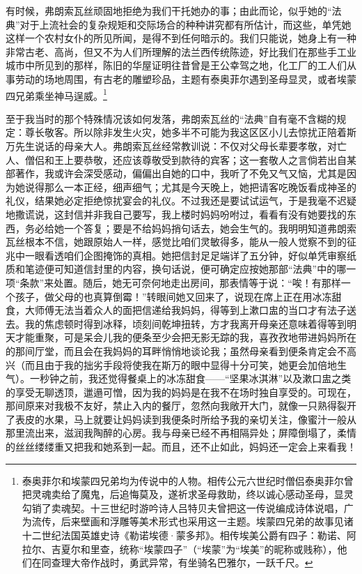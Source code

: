 \par 有时候，弗朗索瓦丝顽固地拒绝为我们干托她办的事；由此而论，似乎她的“法典”对于上流社会的复杂规矩和交际场合的种种讲究都有所估计，而这些，单凭她这样一个农村女仆的所见所闻，是得不到任何暗示的。我们只能说，她身上有一种非常古老、高尚，但又不为人们所理解的法兰西传统陈迹，好比我们在那些手工业城市中所见到的那样，陈旧的华屋证明往昔曾是王公幸驾之地，化工厂的工人们从事劳动的场地周围，有古老的雕塑珍品，主题有泰奥菲尔遇到圣母显灵，或者埃蒙四兄弟乘坐神马逞威。\footnote{泰奥菲尔和埃蒙四兄弟均为传说中的人物。相传公元六世纪时僧侣泰奥菲尔曾把灵魂卖给了魔鬼，后追悔莫及，遂祈求圣母救助，终以诚心感动圣母，显灵勾销了卖魂契。十三世纪时游吟诗人吕特贝夫曾把这一传说编成诗体说唱，广为流传，后来壁画和浮雕等美术形式也采用这一主题。埃蒙四兄弟的故事见诸十二世纪法国英雄史诗《勒诺埃德·蒙多邦》。相传埃美公爵有四子：勒诺、阿拉尔、吉夏尔和里查，统称“埃蒙四子”（“埃蒙”为“埃美”的昵称或贱称），他们在同查理大帝作战时，勇武异常，有坐骑名巴雅尔，一跃千尺。}
\par 至于我当时的那个特殊情况该如何发落，弗朗索瓦丝的“法典”自有毫不含糊的规定：尊长敬客。所以除非发生火灾，她多半不可能为我这区区小儿去惊扰正陪着斯万先生说话的母亲大人。弗朗索瓦丝经常教训说：不仅对父母长辈要孝敬，对亡人、僧侣和王上要恭敬，还应该尊敬受到款待的宾客；这一套敬人之言倘若出自某部著作，我或许会深受感动，偏偏出自她的口中，我听了不免又气又恼，尤其是因为她说得那么一本正经，细声细气；尤其是今天晚上，她把请客吃晚饭看成神圣的礼仪，结果她必定拒绝惊扰宴会的礼仪。不过我还是要试试运气，于是我毫不迟疑地撒谎说，这封信并非我自己要写，我上楼时妈妈吩咐过，看看有没有她要找的东西，务必给她一个答复；要是不给妈妈捎句话去，她会生气的。我明明知道弗朗索瓦丝根本不信，她跟原始人一样，感觉比咱们灵敏得多，能从一般人觉察不到的征兆中一眼看透咱们企图掩饰的真相。她把信封足足端详了五分钟，好似单凭审察纸质和笔迹便可知道信封里的内容，换句话说，便可确定应按她那部“法典”中的哪一项“条款”来处置。随后，她无可奈何地走出房间，那表情等于说：“唉！有那样一个孩子，做父母的也真算倒霉！”转眼间她又回来了，说现在席上正在用冰冻甜食，大师傅无法当着众人的面把信递给我妈妈，得等到上漱口盅的当口才有法子送去。我的焦虑顿时得到冰释，顷刻间乾坤扭转，方才我离开母亲还意味着得等到明天才能重聚，可是呆会儿我的便条至少会把无影无踪的我，喜孜孜地带进妈妈所在的那间厅堂，而且会在我妈妈的耳畔悄悄地谈论我；虽然母亲看到便条肯定会不高兴（而且由于我的拙劣手段将使我在斯万的眼中显得十分可笑，她更会加倍地生气）。一秒钟之前，我还觉得餐桌上的冰冻甜食——“坚果冰淇淋”以及漱口盅之类的享受无聊透顶，邋遢可憎，因为我的妈妈是在我不在场时独自享受的。可现在，那间原来对我极不友好，禁止入内的餐厅，忽然向我敞开大门，就像一只熟得裂开了表皮的水果，马上就要让妈妈读到我便条时所给予我的亲切关注，像蜜汁一般从那里流出来，滋润我陶醉的心房。我与母亲已经不再相隔异处；屏障倒塌了，柔情的丝丝缕缕重又把我和她系到一起。而且，还不止如此，妈妈还一定会上来看我！
